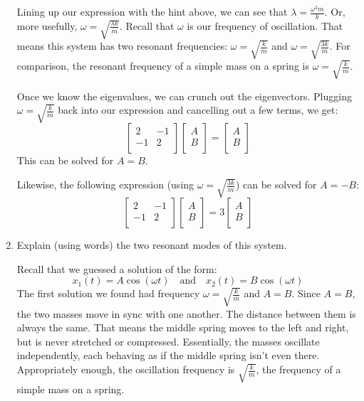 \documentclass[12pt]{article}
\newcommand{\purple}[1]{{\color{purple} #1}}
\begin{document}
\begin{enumerate}
\purple{
Lining up our expression with the hint above, we can see that $\lambda = \frac{\omega^2 m}{k}$. Or, more usefully, $\omega = \sqrt{\frac{\lambda k}{m}}$. Recall that $\omega$ is our frequency of oscillation. That means this system has two resonant frequencies: $\omega = \sqrt{\frac{k}{m}}$ and $\omega = \sqrt{\frac{3k}{m}}$. For comparison, the resonant frequency of a simple mass on a spring is $\omega = \sqrt{\frac{k}{m}}$.

Once we know the eigenvalues, we can crunch out the eigenvectors. Plugging $\omega = \sqrt{\frac{k}{m}}$ back into our expression and cancelling out a few terms, we get:
$$
\left[
{\begin{array}{cc}
   2 & -1\\
   -1 & 2\\
  \end{array} }
\right]
\left[
{\begin{array}{c}
   A\\
   B\\
  \end{array} }
\right]
 = 
 \left[
{\begin{array}{c}
   A\\
   B\\
  \end{array} }
\right]
$$
This can be solved for $A = B$.

Likewise, the following expression (using $\omega = \sqrt{\frac{3k}{m}}$) can be solved for $A = -B$:
$$
\left[
{\begin{array}{cc}
   2 & -1\\
   -1 & 2\\
  \end{array} }
\right]
\left[
{\begin{array}{c}
   A\\
   B\\
  \end{array} }
\right]
 = 
 3
 \left[
{\begin{array}{c}
   A\\
   B\\
  \end{array} }
\right]
$$
}
\item Explain (using words) the two resonant modes of this system.

\purple{
Recall that we guessed a solution of the form:
$$
x_1(t) = A\cos \left( \omega t \right)
\quad\text{and}\quad
x_2(t) = B\cos \left( \omega t \right)
$$
The first solution we found had frequency $\omega = \sqrt{\frac{k}{m}}$ and $A = B$. Since $A = B$, the two masses move in sync with one another. The distance between them is always the same. That means the middle spring moves to the left and right, but is never stretched or compressed. Essentially, the masses oscillate independently, each behaving as if the middle spring isn't even there. Appropriately enough, the oscillation frequency is $\sqrt{\frac{k}{m}}$, the frequency of a simple mass on a spring. 

}
\end{enumerate}
\end{document}
